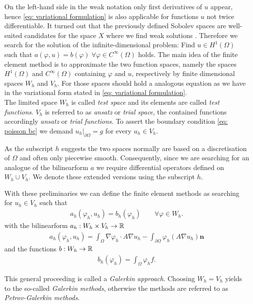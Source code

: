 On the left-hand side in the weak notation only first derivatives of $u$ appear, hence \eqref{eq: variational formulation} is also applicable for functions $u$ not twice differentiable. It turned out that the previously defined Sobolev spaces are well-suited candidates for the space $X$ where we find weak solutions \cite[Chapter 1]{BS2002}. Therefore we search for the solution of the infinite-dimensional problem: Find $u\in H^1(\Omega)$ such that  $a(\varphi,u)  = b(\varphi) \;\forall \varphi \in C^\infty(\Omega)$ holds. %
The main idea of the finite element method is to approximate the two function spaces, namely the spaces $H^1(\Omega)$ and $C^\infty(\Omega)$ containing $\varphi$ and $u$, respectively by finite dimensional spaces $W_h$ and $V_h$. For those spaces should hold a analogous equation as we have in the variational form stated in \eqref{eq: variational formulation}.\\
The limited space $W_h$ is called \emph{test space} and its elements are called \emph{test functions}. $V_h$ is referred to as \emph{ansatz} or \emph{trial space}, the contained functions accordingly \emph{ansatz} or \emph{trial functions}. To assert the boundary condition \eqref{eq: poisson bc} we demand $u_h|_{\partial \Omega} = g$ for every $u_h \in V_h$.

As the subscript $h$ suggests the two spaces normally are based on a discretisation of $\Omega$ and often only piecewise smooth. Consequently, since we are searching for an analogue of the bilinearform $a$ we require differential operators defined on $W_h \cup V_h$. We denote these extended versions using the subscript $h$.

With these preliminaries we can define the finite element methods as searching for $u_h \in V_h$ such that 
\begin{align}
a_h(\varphi_h,u_h) = b_h(\varphi_h) \qquad \forall \varphi \in W_h. \label{eq: FE variational formulation}
\end{align}
with the bilinearform  $a_h:W_h \times V_h \rightarrow \mathbb{R}$
\begin{align*}
a_h(\varphi_h,u_h)  = \int_\Omega \nabla \varphi_h  \cdot A\nabla u_h -\int_{\partial \Omega} \varphi_h (A\nabla u_h) \mathbf{n}
\end{align*}
and the functions $b:W_h \rightarrow \mathbb{R}$
\begin{align*}
b_h(\varphi_h) = \int_\Omega \varphi_h f.
\end{align*}

This general proceeding is called a \emph{Galerkin approach}. Choosing $W_h = V_h$ yields to the so-called \emph{Galerkin methods}, otherwise the methods are referred to as \emph{Petrov-Galerkin methods}.

